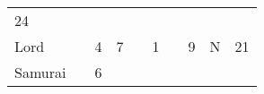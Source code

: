 \documentclass[12pt]{article}
\newcommand{\indexClass}[1]{\index{#1}}
\newcommand{\class}[1]{#1\indexClass{#1}}
\begin{document}
\begin{longtable}[]{@{}llllllllll@{}}
\begin{minipage}[t]{0.08\columnwidth}\raggedright\strut
24
\strut\end{minipage}\tabularnewline
\begin{minipage}[t]{0.13\columnwidth}\raggedright\strut
\class{Lord}
\strut\end{minipage} &
\begin{minipage}[t]{0.06\columnwidth}\raggedright\strut
\strut\end{minipage} &
\begin{minipage}[t]{0.06\columnwidth}\raggedright\strut
4
\strut\end{minipage} &
\begin{minipage}[t]{0.06\columnwidth}\raggedright\strut
7
\strut\end{minipage} &
\begin{minipage}[t]{0.06\columnwidth}\raggedright\strut
\strut\end{minipage} &
\begin{minipage}[t]{0.06\columnwidth}\raggedright\strut
1
\strut\end{minipage} &
\begin{minipage}[t]{0.06\columnwidth}\raggedright\strut
\strut\end{minipage} &
\begin{minipage}[t]{0.06\columnwidth}\raggedright\strut
9
\strut\end{minipage} &
\begin{minipage}[t]{0.07\columnwidth}\raggedright\strut
N
\strut\end{minipage} &
\begin{minipage}[t]{0.08\columnwidth}\raggedright\strut
21
\strut\end{minipage}\tabularnewline
\begin{minipage}[t]{0.13\columnwidth}\raggedright\strut
\class{Samurai}
\strut\end{minipage} &
\begin{minipage}[t]{0.06\columnwidth}\raggedright\strut
\strut\end{minipage} &
\begin{minipage}[t]{0.06\columnwidth}\raggedright\strut
6
\strut\end{minipage} &
\begin{minipage}[t]{0.06\columnwidth}\raggedright\strut
\strut\end{minipage} &
\begin{minipage}[t]{0.06\columnwidth}\raggedright\strut
\strut\end{minipage} &

\end{longtable}
\end{document}
